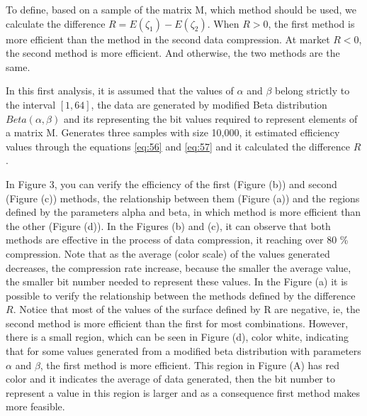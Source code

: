 \documentclass[10pt]{article}
\begin{document}
To define, based on a sample of the matrix M, which method should be used, we calculate the difference $R=E(\zeta_1)-E(\zeta_2)$. When $R>0$, the first method is more efficient than the method in the second data compression. At market $R<0$, the second method is more efficient. And otherwise, the two methods are the same.
 
In this first analysis, it is assumed that the values ​​of $\alpha$ and $\beta$ belong strictly to the interval $[1,64]$, the data are generated by modified Beta distribution $Beta(\alpha,\beta)$ and its representing the bit values required to represent elements of a matrix M. Generates three samples with size 10,000, it estimated efficiency values through the equations \ref{eq:56} and \ref{eq:57} and it calculated the difference $R$.

In Figure 3, you can verify the efficiency of the first (Figure (b)) and second (Figure (c)) methods, the relationship between them (Figure (a)) and the regions defined by the parameters alpha and beta, in which method is more efficient than the other (Figure (d)). In the Figures (b) and (c), it can observe that both methods are effective in the process of data compression, it reaching over 80 \% compression. Note that as the average (color scale) of the values ​​generated decreases, the compression rate increase, because the smaller the average value, the smaller bit number needed to represent these values. In the Figure (a) it is possible to verify the relationship between the methods defined by the difference $R$. Notice that most of the values ​​of the surface defined by R are negative, ie, the second method is more efficient than the first for most combinations. However, there is a small region, which can be seen in Figure (d), color white, indicating that for some values ​​generated from a modified 
beta distribution 
with parameters $\alpha$ and $\beta$, the first method is more efficient. This region in Figure (A) has red color and it indicates the average of data generated, then the bit number to represent a value in this region is larger and as a consequence first method makes more feasible.
 
\end{document}
